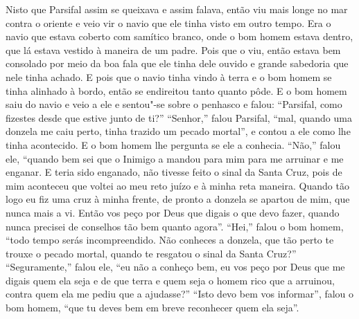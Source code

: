 Nisto que Parsifal assim se queixava e assim falava, então viu mais longe
no mar contra o oriente e veio vir o navio que ele tinha visto em outro tempo.
Era o navio que estava coberto com samítico branco, onde o bom homem estava
dentro, que lá estava vestido à maneira de um padre. Pois que o viu, então
estava bem consolado por meio da boa fala que ele tinha dele ouvido e grande
sabedoria que nele tinha achado. E pois que o navio tinha vindo à terra e o bom
homem se tinha alinhado à bordo, então se endireitou tanto quanto pôde. E o bom
homem saiu do navio e veio a ele e sentou"-se sobre o penhasco e falou:
“Parsifal, como fizestes desde que estive junto de ti?” “Senhor,” falou
Parsifal, “mal, quando uma donzela me caiu perto, tinha trazido um pecado
mortal”, e contou a ele como lhe tinha acontecido. E o bom homem lhe pergunta
se ele a conhecia. “Não,” falou ele, “quando bem sei que o Inimigo a mandou
para mim para me arruinar e me enganar. E teria sido enganado, não tivesse
feito o sinal da Santa Cruz, pois de mim aconteceu que voltei ao meu reto juízo
e à minha reta maneira. Quando tão logo eu fiz uma cruz à minha frente, de
pronto a donzela se apartou de mim, que nunca mais a vi. Então vos peço por
Deus que digais o que devo fazer, quando nunca precisei de conselhos tão bem
quanto agora”. “Hei,” falou o bom homem, “todo tempo serás
incompreendido. Não conheces a donzela, que tão perto te trouxe o pecado
mortal, quando te resgatou o sinal da Santa Cruz?” “Seguramente,” falou ele,
“eu não a conheço bem, eu vos peço por Deus que me digais quem ela seja e de
que terra e quem seja o homem rico que a arruinou, contra quem ela me pediu que
a ajudasse?” “Isto devo bem vos informar”, falou o bom homem, “que tu
deves bem em breve reconhecer quem ela seja”.

